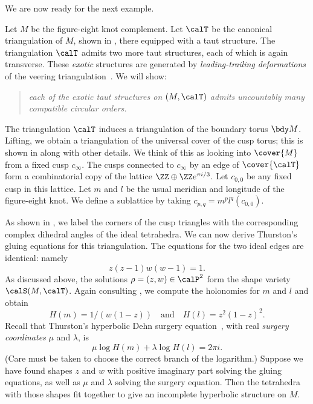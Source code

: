 \documentclass[12pt]{amsart}
\begin{document}
We are now ready for the next example.

\begin{example}
\label{Exa:FlatDSS}
Let $M$ be the figure-eight knot complement.  Let $\calT$ be the canonical triangulation of $M$, shown in , there equipped with a taut structure.  The triangulation $\calT$ admits two more taut structures, each of which is again transverse.  These \emph{exotic} structures are generated by \emph{leading-trailing deformations} of the veering triangulation~\cite[Proposition 6.8]{FuterGueritaud13}.
We will show: 
\begin{quote}
\emph{each of the exotic taut structures on $(M, \calT)$ admits uncountably many compatible circular orders.}
\end{quote}
\noindent
The triangulation $\calT$ induces a triangulation of the boundary torus $\bdy M$.  Lifting, we obtain a triangulation of the universal cover of the cusp torus; this is shown in  along with other details.  We think of this as looking into $\cover{M}$ from a fixed cusp $c_\infty$.  The cusps connected to $c_\infty$ by an edge of $\cover{\calT}$ form a combinatorial copy of the lattice $\ZZ \oplus \ZZ e^{\pi i/3}$.  Let $c_{0,0}$ be any fixed cusp in this lattice.  Let $m$ and $l$ be the usual meridian and longitude of the figure-eight knot.  We define a sublattice by taking $c_{p,q} = m^p l^q (c_{0,0})$.  

As shown in , we label the corners of the cusp triangles with the corresponding complex dihedral angles of the ideal tetrahedra.  We can now derive Thurston's gluing equations for this triangulation.  The equations for the two ideal edges are identical: namely 
\[
z(z-1)w(w-1) = 1.
\]
As discussed above, the solutions $\rho = (z, w) \in \calP^2$ form the shape variety $\calS(M, \calT)$.  Again consulting , we compute the holonomies for $m$ and $l$ and obtain
\[
H(m) = 1/(w(1-z)) \quad \mbox{and} \quad H(l) = z^2(1-z)^2.
\] 
Recall that Thurston's hyperbolic Dehn surgery equation~\cite[page~57]{thurston_notes}, with real \emph{surgery coordinates} $\mu$ and $\lambda$, is
\[
\mu \log H(m) + \lambda \log H(l) = 2 \pi i.
\]
(Care must be taken to choose the correct branch of the logarithm.)  Suppose we have found shapes $z$ and $w$ with positive imaginary part solving the gluing equations, as well as $\mu$ and $\lambda$ solving the surgery equation.  Then the tetrahedra with those shapes fit together to give an incomplete hyperbolic structure on $M$.  


\end{example}
\end{document}
